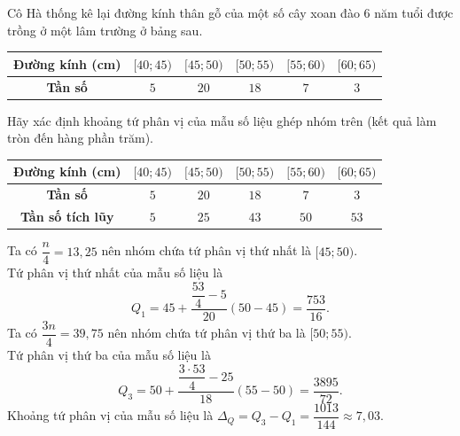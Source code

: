\begin{bt}%
	Cô Hà thống kê lại đường kính thân gỗ của một số cây xoan đào 6 năm tuổi được trồng ở một lâm trường ở bảng sau.
	\begin{center}
		\begin{tabular}{|c|c|c|c|c|c|}
			\hline
			\textbf{Đường kính (cm)} & $[40;45)$ & $[45;50)$ & $[50;55)$ & $[55;60)$ & $[60;65)$ \\ \hline
			\textbf{Tần số}          & $5$           & $20$          & $18$          & $7$           & $3$           \\ \hline
		\end{tabular}
	\end{center}
	Hãy xác định khoảng tứ phân vị của mẫu số liệu ghép nhóm trên (kết quả làm tròn đến hàng phần trăm).
	\loigiai
	{
		\begin{center}
			\begin{tabular}{|c|c|c|c|c|c|}
				\hline
				\textbf{Đường kính (cm)} & $[40;45)$ & $[45;50)$ & $[50;55)$ & $[55;60)$ & $[60;65)$ \\ \hline
				\textbf{Tần số}          & $5$           & $20$          & $18$          & $7$           & $3$           \\ \hline
				\textbf{Tần số tích lũy} & $5$ & $25$ & $43$ & $50$ & $53$\\\hline
			\end{tabular}
		\end{center}
		Ta có $\dfrac{n}{4}=13{,}25$ nên nhóm chứa tứ phân vị thứ nhất là $[45;50)$.\\
		Tứ phân vị thứ nhất của mẫu số liệu là
		\[Q_1=45+\dfrac{\dfrac{53}{4}-5}{20}(50-45)=\dfrac{753}{16}. \]
		Ta có $\dfrac{3n}{4}=39{,}75$ nên nhóm chứa tứ phân vị thứ ba là $[50;55)$.\\
		Tứ phân vị thứ ba của mẫu số liệu là
		\[Q_3=50+\dfrac{\dfrac{3\cdot 53}{4}-25}{18}(55-50)=\dfrac{3895}{72}. \]
		Khoảng tứ phân vị của mẫu số liệu là $\Delta_Q=Q_3-Q_1=\dfrac{1013}{144}\approx 7{,}03$.
	}
\end{bt}


